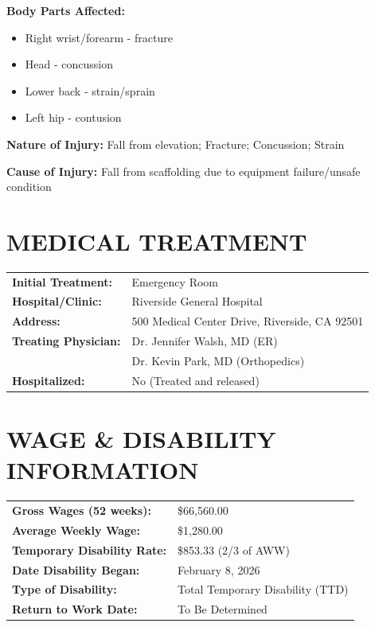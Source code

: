 \documentclass[11pt]{article}
\begin{document}
\textbf{Body Parts Affected:}
\begin{itemize}[nosep]
\item Right wrist/forearm - fracture
\item Head - concussion
\item Lower back - strain/sprain
\item Left hip - contusion
\end{itemize}

\textbf{Nature of Injury:} Fall from elevation; Fracture; Concussion; Strain

\textbf{Cause of Injury:} Fall from scaffolding due to equipment failure/unsafe condition

\section*{MEDICAL TREATMENT}

\begin{tabular}{@{}p{4cm}p{10cm}@{}}
\textbf{Initial Treatment:} & Emergency Room \\
\textbf{Hospital/Clinic:} & Riverside General Hospital \\
\textbf{Address:} & 500 Medical Center Drive, Riverside, CA 92501 \\
\textbf{Treating Physician:} & Dr. Jennifer Walsh, MD (ER) \\
& Dr. Kevin Park, MD (Orthopedics) \\
\textbf{Hospitalized:} & No (Treated and released) \\
\end{tabular}

\section*{WAGE \& DISABILITY INFORMATION}

\begin{tabular}{@{}p{5cm}p{9cm}@{}}
\textbf{Gross Wages (52 weeks):} & \$66,560.00 \\
\textbf{Average Weekly Wage:} & \$1,280.00 \\
\textbf{Temporary Disability Rate:} & \$853.33 (2/3 of AWW) \\
\textbf{Date Disability Began:} & February 8, 2026 \\
\textbf{Type of Disability:} & Total Temporary Disability (TTD) \\
\textbf{Return to Work Date:} & To Be Determined \\
\end{tabular}
\end{document}
